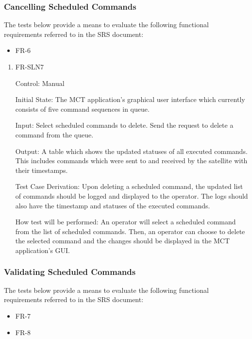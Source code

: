 \documentclass[12pt, titlepage]{article}
\begin{document}
\subsubsection{Cancelling Scheduled Commands}

The tests below provide a means to evaluate the following functional requirements referred to in the SRS document:
\begin{itemize}
    \item FR-6
\end{itemize}

\begin{enumerate}

\item{FR-SLN7\\}

Control: Manual
					
Initial State: The MCT application’s graphical user interface which currently consists of five command sequences in queue.
					
Input: Select scheduled commands to delete. Send the request to delete a command from the queue.
					
Output: A table which shows the updated statuses of all executed commands. This includes commands which were sent to and received by the satellite with their timestamps.

Test Case Derivation: Upon deleting a scheduled command, the updated list of commands should be logged and displayed to the operator. The logs should also have the timestamp and statuses of the executed commands.
					
How test will be performed: 
An operator will select a scheduled command from the list of scheduled commands. Then, an operator can choose to delete the selected command and the changes should be displayed in the MCT application’s GUI.

\end{enumerate}


\subsubsection{Validating Scheduled Commands}

The tests below provide a means to evaluate the following functional requirements referred to in the SRS document:
\begin{itemize}
    \item FR-7
    \item FR-8
\end{itemize}
\end{document}
